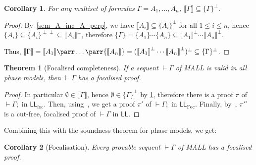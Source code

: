 \documentclass{article}
\newtheorem{theorem}{Theorem}
\newtheorem{corollary}{Corollary}[theorem]
\newcommand\LL{\textsf{LL}}
\newcommand\LLfoc{{\LL_\text{foc}}}
\newcommand\LLFoc{{\LL_\text{Foc}}}
\newcommand\sem[1]{{\llbracket #1 \rrbracket}}
\newcommand\biperp{{\perp\perp}}
\begin{document}
\begin{corollary}
    \label{sem_Gamma_inc_Gamma_perp}
    For any multiset of formulas $\Gamma = A_1, \dots, A_n$, $\sem{\Gamma} \subseteq \{\Gamma\}^\perp$.
\end{corollary}
\begin{proof}
    By~\cref{sem_A_inc_A_perp}, we have $\sem{A_i} \subseteq \{A_i\}^\perp$ for all $1 \le i \le n$, hence $\{A_i\} \subseteq \{A_i\}^\biperp \subseteq \sem{A_i}^\perp$, therefore $\{\Gamma\} = \{A_1\} \cdots \{A_n\} \subseteq \sem{A_1}^\perp \cdots \sem{A_n}^\perp$.

    Thus, $\sem{\Gamma} = \sem{A_1} \parr \dots \parr \sem{A_n} = (\sem{A_1}^\perp \cdots \sem{A_n}^\perp)^\perp \subseteq \{\Gamma\}^\perp$.
\end{proof}

\begin{theorem}[Focalised completeness]
    If a sequent $\vdash \Gamma$ of MALL is valid in all phase models, then $\vdash \Gamma$ has a focalised proof.
\end{theorem}
\begin{proof}
    In particular $\emptyset \in \sem{\Gamma}$, hence $\emptyset \in \{\Gamma\}^\perp$ by \cref{sem_Gamma_inc_Gamma_perp}, therefore there is a proof $\pi$ of $\vdash \Gamma;$ in $\LLfoc$. Then, using~\cite[section 3.2]{laurent}, we get a proof $\pi'$ of $\vdash \Gamma;$ in $\LLFoc$. Finally, by~\cite[proposition 2]{laurent}, $\pi'^\circ$ is a cut-free, focalised proof of $\vdash \Gamma$ in $\LL$.
\end{proof}

Combining this with the soundness theorem for phase models, we get:
\begin{corollary}[Focalisation]
    Every provable sequent $\vdash \Gamma$ of MALL has a focalised proof.
\end{corollary}

\printbibliography
\end{document}
